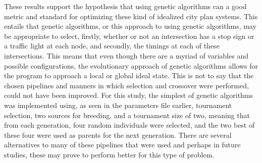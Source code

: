 These results support the hypothesis that using genetic algorithms can a good metric and standard for optimizing these kind of idealized city plan systems.  This entails that genetic algorithms, or this approach to using genetic algorithms, may be appropriate to select, firstly, whether or not an intersection has a stop sign or a traffic light at each node, and secondly, the timings at each of these intersections.  This means that even though there are a myriad of variables and possible configurations, the evolutionary approach of genetic algorithms allows for the program to approach a local or global ideal state.  This is not to say that the chosen pipelines and manners in which selection and crossover were performed, could not have been improved.  For this study, the simplest of genetic algorithms was implemented using, as seen in the parameters file earlier, tournament selection, two sources for breeding, and a tournament size of two, meaning that from each generation, four random individuals were selected, and the two best of these four were used as parents for the next generation.  There are several alternatives to many of these pipelines that were used and perhaps in future studies, these may prove to perform better for this type of problem.  